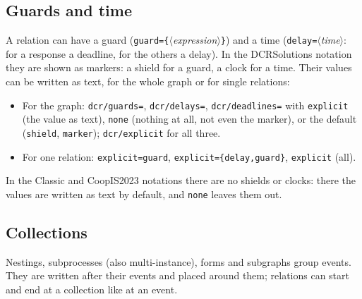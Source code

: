 \documentclass[a4paper,11pt]{article}
\newcommand\example[1]{%
  \begin{tcolorbox}[colback=white, colframe=black!25, boxrule=0.4pt,
      arc=1mm, left=2mm, right=2mm, halign lower=center]
    
    \tcblower
    
  \end{tcolorbox}}
\newcommand\key[1]{\texttt{#1}}
\newcommand\meta[1]{\ensuremath{\langle}\textit{#1}\ensuremath{\rangle}}
\begin{document}
\subsection{Guards and time}\label{sec:values}
A relation can have a guard (\key{guard=\{}\meta{expression}\key{\}}) and a
time (\key{delay=}\meta{time}: for a response a deadline, for the others a
delay). In the DCRSolutions notation they are shown as markers: a shield for a
guard, a clock for a time. Their values can be written as text, for the
whole graph or for single relations:
\example{values}
\begin{itemize}
  \item For the graph: \key{dcr/guards=}, \key{dcr/delays=},
    \key{dcr/deadlines=} with \key{explicit} (the value as text), \key{none}
    (nothing at all, not even the marker), or the default (\key{shield},
    \key{marker}); \key{dcr/explicit} for all three.
  \item For one relation: \key{explicit=guard}, \key{explicit=\{delay,guard\}},
    \key{explicit} (all).
\end{itemize}
In the Classic and CoopIS2023 notations there are no shields or clocks:
there the values are written as text by default, and \key{none} leaves them out.

\subsection{Collections}
Nestings, subprocesses (also multi-instance), forms and subgraphs group
events. They are written after their events and placed around them;
relations can start and end at a collection like at an event.
\example{collections}
\end{document}
